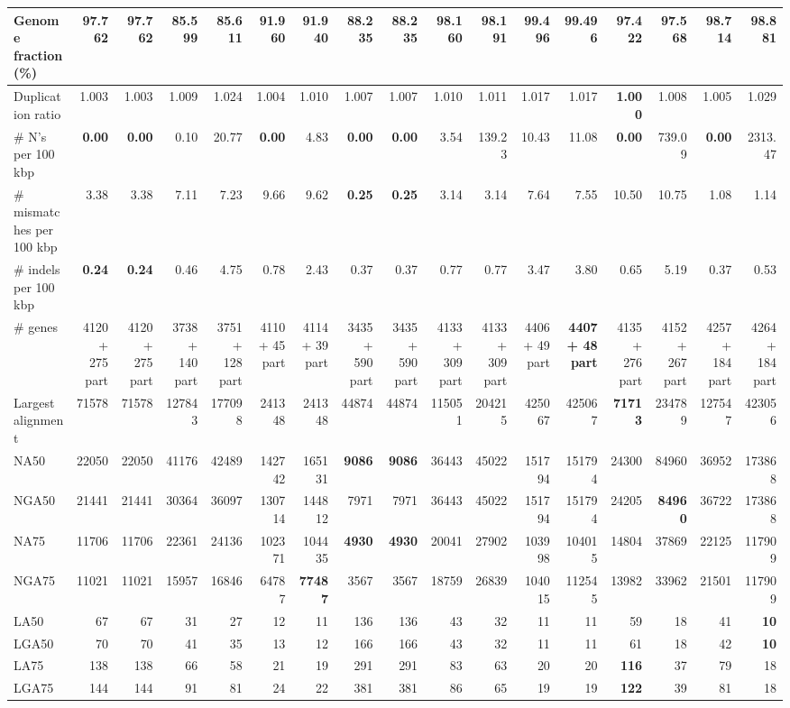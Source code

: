 \documentclass[12pt,a4paper]{article}
\begin{document}
\begin{table}[ht]
\begin{center}
\begin{tabular}{|l*{16}{|r}|}
Genome fraction (\%) & 97.762 & 97.762 & 85.599 & 85.611 & 91.960 & 91.940 & 88.235 & 88.235 & 98.160 & 98.191 & {\bf 99.496} & {\bf 99.496} & 97.422 & 97.568 & 98.714 & 98.881 \\ \hline
Duplication ratio & 1.003 & 1.003 & 1.009 & 1.024 & 1.004 & 1.010 & 1.007 & 1.007 & 1.010 & 1.011 & 1.017 & 1.017 & {\bf 1.000} & 1.008 & 1.005 & 1.029 \\ \hline
\# N's per 100 kbp & {\bf 0.00} & {\bf 0.00} & 0.10 & 20.77 & {\bf 0.00} & 4.83 & {\bf 0.00} & {\bf 0.00} & 3.54 & 139.23 & 10.43 & 11.08 & {\bf 0.00} & 739.09 & {\bf 0.00} & 2313.47 \\ \hline
\# mismatches per 100 kbp & 3.38 & 3.38 & 7.11 & 7.23 & 9.66 & 9.62 & {\bf 0.25} & {\bf 0.25} & 3.14 & 3.14 & 7.64 & 7.55 & 10.50 & 10.75 & 1.08 & 1.14 \\ \hline
\# indels per 100 kbp & {\bf 0.24} & {\bf 0.24} & 0.46 & 4.75 & 0.78 & 2.43 & 0.37 & 0.37 & 0.77 & 0.77 & 3.47 & 3.80 & 0.65 & 5.19 & 0.37 & 0.53 \\ \hline
\# genes & 4120 + 275 part & 4120 + 275 part & 3738 + 140 part & 3751 + 128 part & 4110 + 45 part & 4114 + 39 part & 3435 + 590 part & 3435 + 590 part & 4133 + 309 part & 4133 + 309 part & 4406 + 49 part & {\bf 4407 + 48 part} & 4135 + 276 part & 4152 + 267 part & 4257 + 184 part & 4264 + 184 part \\ \hline
Largest alignment & 71578 & 71578 & 127843 & 177098 & 241348 & 241348 & 44874 & 44874 & 115051 & 204215 & 425067 & 425067 & {\bf 71713} & 234789 & 127547 & 423056 \\ \hline
NA50 & 22050 & 22050 & 41176 & 42489 & 142742 & 165131 & {\bf 9086} & {\bf 9086} & 36443 & 45022 & 151794 & 151794 & 24300 & 84960 & 36952 & 173868 \\ \hline
NGA50 & 21441 & 21441 & 30364 & 36097 & 130714 & 144812 & 7971 & 7971 & 36443 & 45022 & 151794 & 151794 & 24205 & {\bf 84960} & 36722 & 173868 \\ \hline
NA75 & 11706 & 11706 & 22361 & 24136 & 102371 & 104435 & {\bf 4930} & {\bf 4930} & 20041 & 27902 & 103998 & 104015 & 14804 & 37869 & 22125 & 117909 \\ \hline
NGA75 & 11021 & 11021 & 15957 & 16846 & 64787 & {\bf 77487} & 3567 & 3567 & 18759 & 26839 & 104015 & 112545 & 13982 & 33962 & 21501 & 117909 \\ \hline
LA50 & 67 & 67 & 31 & 27 & 12 & 11 & 136 & 136 & 43 & 32 & 11 & 11 & 59 & 18 & 41 & {\bf 10} \\ \hline
LGA50 & 70 & 70 & 41 & 35 & 13 & 12 & 166 & 166 & 43 & 32 & 11 & 11 & 61 & 18 & 42 & {\bf 10} \\ \hline
LA75 & 138 & 138 & 66 & 58 & 21 & 19 & 291 & 291 & 83 & 63 & 20 & 20 & {\bf 116} & 37 & 79 & 18 \\ \hline
LGA75 & 144 & 144 & 91 & 81 & 24 & 22 & 381 & 381 & 86 & 65 & 19 & 19 & {\bf 122} & 39 & 81 & 18 \\ \hline
\end{tabular}
\end{center}
\end{table}
\end{document}
